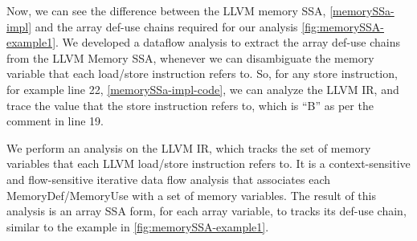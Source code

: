 
Now, we can see the difference between the LLVM memory SSA, 
\autoref{memorySSa-impl} and the array def-use chains  
required for our analysis \autoref{fig:memorySSA-example1}.
We developed a dataflow analysis to 
extract the 
array def-use chains from the LLVM Memory SSA, whenever we can disambiguate the memory variable
that each load/store instruction refers to. 
So, for any store instruction, for example line 22, \autoref{memorySSa-impl-code}, we can analyze the 
LLVM IR, and trace the value that the store instruction refers to, 
which is ``B'' as per the comment in line 19. 

We perform an analysis 
on the LLVM IR, which tracks the set of memory variables that each 
LLVM load/store instruction refers to. 
It is a context-sensitive and flow-sensitive 
iterative data flow analysis that associates each MemoryDef/MemoryUse with a set of memory variables. The result of this analysis is an
array SSA form, for each array variable, to tracks its def-use chain, 
similar to the example in \autoref{fig:memorySSA-example1}.
